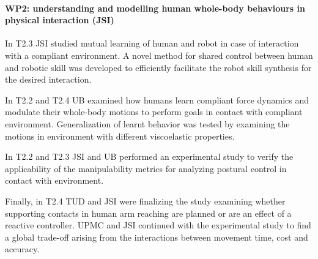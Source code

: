 






 
\paragraph*{WP2: understanding and modelling human whole-body behaviours in physical interaction (JSI)}

In T2.3 JSI studied mutual learning of human and robot in case of interaction with a compliant environment. A novel method for shared control between human and robotic skill was developed to efficiently facilitate the robot skill synthesis for the desired interaction.

In T2.2 and T2.4 UB examined how humans learn compliant force dynamics and modulate their whole-body motions to perform goals in contact with compliant environment. Generalization of learnt behavior was tested by examining the motions in environment with different viscoelastic properties.

In T2.2 and T2.3 JSI and UB performed an experimental study to verify the applicability of the manipulability metrics for analyzing postural control in contact with environment.

Finally, in T2.4 TUD and JSI were finalizing the study examining whether supporting contacts in human arm reaching are planned or are an effect of a reactive controller. UPMC and JSI continued with the experimental study to find a global trade-off arising from the interactions between movement time, cost and accuracy.